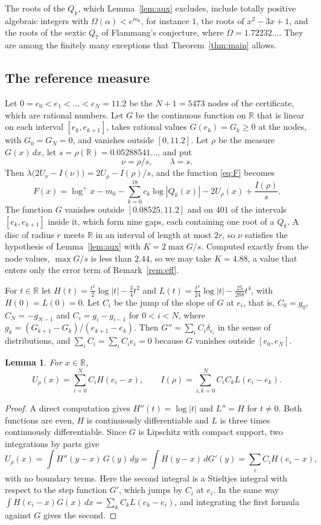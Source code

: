 \documentclass[11pt]{amsart}
\newtheorem{lemma}[theorem]{Lemma}
\theoremstyle{remark}
\numberwithin{equation}{section}
\newcommand{\R}{\mathbb{R}}
\newcommand{\logp}{\log^{+}}
\newcommand{\NNodes}{5473}
\newcommand{\Sval}{0.05288541}
\newcommand{\Kconst}{4.88}
\newcommand{\GmaxRatio}{2.44}
\newcommand{\SuppLo}{0.08525}
\newcommand{\SuppHi}{11.2}
\newcommand{\NZero}{401}
\begin{document}
The roots of the $Q_k$, which Lemma~\ref{lem:aux} excludes, include totally positive algebraic integers with $\Omega(\alpha)<e^{m_0}$, for instance $1$, the roots of $x^2-3x+1$, and the roots of the sextic $Q_7$ of Flammang's conjecture, where $\Omega=1.72232\ldots$. They are among the finitely many exceptions that Theorem~\ref{thm:main} allows.

\subsection{The reference measure}
Let $0=e_0<e_1<\dots<e_N=\SuppHi$ be the $N+1=\NNodes$ nodes of the certificate, which are rational numbers. Let $G$ be the continuous function on $\R$ that is linear on each interval $[e_k,e_{k+1}]$, takes rational values $G(e_k)=G_k\ge0$ at the nodes, with $G_0=G_N=0$, and vanishes outside $[0,\SuppHi]$. Let $\rho$ be the measure $G(x)\,dx$, let $s=\rho(\R)=\Sval\ldots$, and put
\[
\nu=\rho/s,\qquad\lambda=s.
\]
Then $\lambda\bigl(2U_\nu-I(\nu)\bigr)=2U_\rho-I(\rho)/s$, and the function \eqref{eq:F} becomes
\begin{equation}\label{eq:Fcert}
F(x)=\logp x-m_0-\sum_{k=0}^{18}c_k\log|Q_k(x)|-2U_\rho(x)+\frac{I(\rho)}s.
\end{equation}
The function $G$ vanishes outside $[\SuppLo,\SuppHi]$ and on $\NZero$ of the intervals $[e_k,e_{k+1}]$ inside it, which form nine gaps, each containing one root of a $Q_k$. A disc of radius $r$ meets $\R$ in an interval of length at most $2r$, so $\nu$ satisfies the hypothesis of Lemma~\ref{lem:aux} with $K=2\max G/s$. Computed exactly from the node values, $\max G/s$ is less than $\GmaxRatio$, so we may take $K=\Kconst$, a value that enters only the error term of Remark~\ref{rem:eff}.

For $t\in\R$ let $H(t)=\frac{t^2}2\log|t|-\frac34t^2$ and $L(t)=\frac{t^4}{24}\log|t|-\frac{25}{288}t^4$, with $H(0)=L(0)=0$. Let $C_i$ be the jump of the slope of $G$ at $e_i$, that is, $C_0=g_0$, $C_N=-g_{N-1}$ and $C_i=g_i-g_{i-1}$ for $0<i<N$, where $g_k=(G_{k+1}-G_k)/(e_{k+1}-e_k)$. Then $G''=\sum_iC_i\delta_{e_i}$ in the sense of distributions, and $\sum_iC_i=\sum_iC_ie_i=0$ because $G$ vanishes outside $[e_0,e_N]$.

\begin{lemma}\label{lem:closed}
For $x\in\R$,
\[
U_\rho(x)=\sum_{i=0}^NC_iH(e_i-x),\qquad I(\rho)=\sum_{i,k=0}^NC_iC_kL(e_i-e_k).
\]
\end{lemma}

\begin{proof}
A direct computation gives $H''(t)=\log|t|$ and $L''=H$ for $t\ne0$. Both functions are even, $H$ is continuously differentiable and $L$ is three times continuously differentiable. Since $G$ is Lipschitz with compact support, two integrations by parts give
\[
U_\rho(x)=\int H''(y-x)\,G(y)\,dy=\int H(y-x)\,dG'(y)=\sum_iC_iH(e_i-x),
\]
with no boundary terms. Here the second integral is a Stieltjes integral with respect to the step function $G'$, which jumps by $C_i$ at $e_i$. In the same way $\int H(e_i-x)G(x)\,dx=\sum_kC_kL(e_k-e_i)$, and integrating the first formula against $G$ gives the second.
\end{proof}
\end{document}
